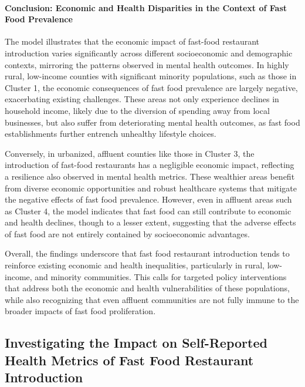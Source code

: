\documentclass[letterpaper, 11pt]{report}
\begin{document}
\paragraph{Conclusion: Economic and Health Disparities in the Context of Fast Food Prevalence}

The model illustrates that the economic impact of fast-food restaurant introduction varies significantly across different socioeconomic and demographic contexts, mirroring the patterns observed in mental health outcomes. In highly rural, low-income counties with significant minority populations, such as those in Cluster 1, the economic consequences of fast food prevalence are largely negative, exacerbating existing challenges. These areas not only experience declines in household income, likely due to the diversion of spending away from local businesses, but also suffer from deteriorating mental health outcomes, as fast food establishments further entrench unhealthy lifestyle choices.

Conversely, in urbanized, affluent counties like those in Cluster 3, the introduction of fast-food restaurants has a negligible economic impact, reflecting a resilience also observed in mental health metrics. These wealthier areas benefit from diverse economic opportunities and robust healthcare systems that mitigate the negative effects of fast food prevalence. However, even in affluent areas such as Cluster 4, the model indicates that fast food can still contribute to economic and health declines, though to a lesser extent, suggesting that the adverse effects of fast food are not entirely contained by socioeconomic advantages.

Overall, the findings underscore that fast food restaurant introduction tends to reinforce existing economic and health inequalities, particularly in rural, low-income, and minority communities. This calls for targeted policy interventions that address both the economic and health vulnerabilities of these populations, while also recognizing that even affluent communities are not fully immune to the broader impacts of fast food proliferation.


\subsection{Investigating the Impact on Self-Reported Health Metrics of Fast Food Restaurant Introduction}
\end{document}
